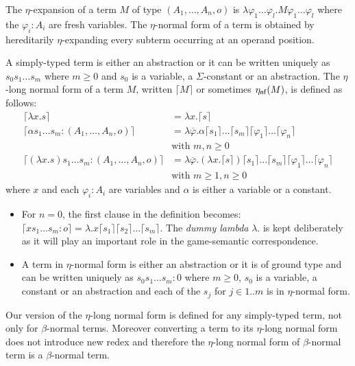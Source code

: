 \documentclass{llncs}
\newcommand\aux[1]{\lceil #1\rceil}
\newcommand\etanf[1]{\eta_{\sf nf}(#1)}
\begin{document}
The $\eta$-expansion of a term $M$ of type $(A_1,\ldots,A_n,o)$ is
$\lambda \varphi_1 \ldots \varphi_l . M \varphi_1 \ldots \varphi_l$
where the $\varphi_i:A_i$ are fresh variables. The $\eta$-normal
form of a term is obtained by hereditarily $\eta$-expanding every
subterm occurring at an operand position.

\begin{definition}
A simply-typed term is either an abstraction or it can be written uniquely as
$s_0 s_1 \ldots s_m$ where $m\geq0$ and $s_0$ is a variable, a $\Sigma$-constant or an abstraction.
The $\eta$-long normal form of a term $M$, written $\aux{M}$ or sometimes $\etanf{M}$,
is defined as follows:
\begin{align*}
\aux{\lambda x . s } &= \lambda x . \aux{s} \\
\aux{\alpha s_1 \ldots s_m : (A_1,\ldots,A_n,o)} &= \lambda \overline{\varphi} . \alpha \aux{s_1}\ldots \aux{s_m} \aux{\varphi_1} \ldots \aux{\varphi_n} \\
& \mbox{with $m,n\geq0$}\\
\aux{(\lambda x . s) s_1 \ldots s_m : (A_1,\ldots,A_n,o) } &= \lambda \overline{\varphi} . (\lambda x . \aux{s}) \aux{s_1} \ldots \aux{s_m} \aux{\varphi_1} \ldots \aux{\varphi_n} \\
& \mbox{with $m\geq 1,n\geq0$}
\end{align*}
where $x$ and each $\varphi_i : A_i$ are variables and $\alpha$ is
either a variable or a constant.
\end{definition}

\begin{remark}
\begin{itemize}
\item For $n=0$, the first clause in the definition becomes:
$\aux{x s_1 \ldots s_m : o} = \lambda . x \aux{s_1} \aux{s_2} \ldots \aux{s_m}.$
The \textsl{dummy lambda} $\lambda .$ is kept deliberately as it will play an important role in the
game-semantic correspondence.

\item A term in $\eta$-normal form is either an abstraction or it is of ground type and can be written uniquely as
$s_0 s_1 \ldots s_m : 0$ where $m\geq0$,  $s_0$ is a variable, a constant or an abstraction and each of the $s_j$ for $j\in 1..m$ is in $\eta$-normal form.
\end{itemize}
\end{remark}

Our version of the $\eta$-long normal form is defined for any simply-typed term, not only for $\beta$-normal terms.
Moreover converting a term to its $\eta$-long normal form does not introduce new redex and therefore
the $\eta$-long normal form of $\beta$-normal term is a $\beta$-normal term.
\end{document}
